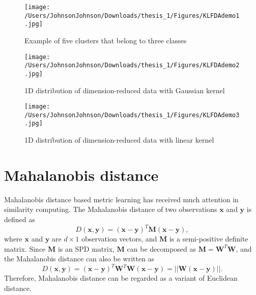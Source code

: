 \begin{figure}[H]
\centering
\texttt{[image: /Users/JohnsonJohnson/Downloads/thesis\_1/Figures/KLFDAdemo1.jpg]}
\caption{Example of five clusters that belong to three classes}
\label{KLFDAdemo1}
\vspace{-1em}
\end{figure} 


\begin{figure}[H]
\centering
\texttt{[image: /Users/JohnsonJohnson/Downloads/thesis\_1/Figures/KLFDAdemo2.jpg]}
\caption{1D distribution of dimension-reduced data with Gaussian kernel}
\label{KLFDAdemo2}
\vspace{-1em}
\end{figure} 


\begin{figure}[H]
\centering
\texttt{[image: /Users/JohnsonJohnson/Downloads/thesis\_1/Figures/KLFDAdemo3.jpg]}
\caption{1D distribution of dimension-reduced data with linear kernel}
\label{KLFDAdemo3}
\vspace{-1em}
\end{figure} 


\section{Mahalanobis distance}
Mahalanobis distance \cite{Mahadist} based metric learning has received much attention in similarity computing. The Mahalanobis distance of two observations $\bm{x} $ and $\bm{y}$ is defined as
\begin{equation}
\label{MahaDist}
D(\bm{x},\bm{y}) = (\bm{x} - \bm{y})^T\bm{M}(\bm{x} - \bm{y}), 
\end{equation}
where $\bm{x}$ and $\bm{y} $ are $d\times1$ observation vectors, and $\bm{M}$ is a semi-positive definite matrix. Since $\bm{M}$ is an SPD matrix, $\bm{M}$ can be decomposed as $\bm{M} = \bm{W}^T\bm{W}$, and the Mahalanobis distance can also be written as 
\begin{equation}
D(\bm{x},\bm{y}) = (\bm{x} - \bm{y})^T\bm{W}^T\bm{W}(\bm{x} - \bm{y})= ||\bm{W}(\bm{x} - \bm{y})||.
\end{equation}
 Therefore, Mahalanobis distance can be regarded as a variant of Euclidean distance.
 
